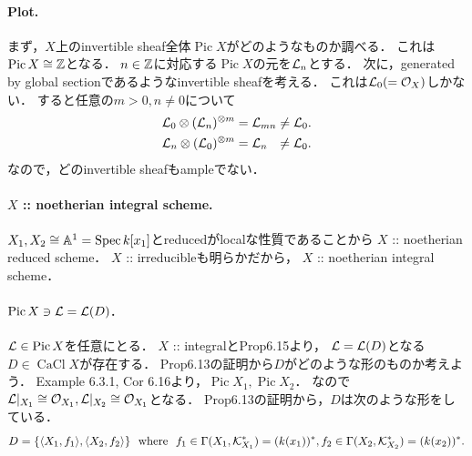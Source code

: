 \documentclass[a4paper]{jsarticle}
\newcommand{\CaCl}{\operatorname{CaCl}}
\newcommand{\Pic}{\operatorname{Pic}}
\begin{document}
    \paragraph{Plot.}
    まず，$X$上のinvertible sheaf全体$\Pic X$がどのようなものか調べる．
    これは$\Pic X \iso \Z$となる．
    $n \in \mathbb{Z}$に対応する$\Pic X$の元を$\mathcal{L}_n$とする．
    次に，generated by global sectionであるようなinvertible sheafを考える．
    これは$\mathcal{L}_0(=\mathcal{O}_X)$しかない．
    すると任意の$m>0, n \neq 0$について
    \begin{align*}
        \mathcal{L}_0 \otimes (\mathcal{L}_n)^{\otimes m} &= \mathcal{L}_{mn} \neq \mathcal{L}_0. \\
        \mathcal{L}_n \otimes (\mathcal{L}_0)^{\otimes m} &= \mathcal{L}_n \hspace{7pt}\neq \mathcal{L}_0.
    \end{align*}
    なので，どのinvertible sheafもampleでない．

    \paragraph{$X$ :: noetherian integral scheme.}
    $X_1, X_2 \cong \mathbb{A}^1=\operatorname{Spec} k[x_1]$とreducedがlocalな性質であることから
    $X$ :: noetherian reduced scheme．
    $X$ :: irreducibleも明らかだから，
    $X$ :: noetherian integral scheme．

    \paragraph{$\Pic X \ni \shL=\shL(D)$.}
    $\shL \in \Pic X$を任意にとる．
    $X$ :: integralとProp6.15より，
    $\mathcal{L}=\mathcal{L}(D)$となる$D \in \CaCl X$が存在する．
    Prop6.13の証明から$D$がどのような形のものか考えよう．
    Example 6.3.1, Cor 6.16より，$\Pic X_1, \Pic X_2$．
    なので$\mathcal{L}|_{X_1} \cong \mathcal{O}_{X_1}, \mathcal{L}|_{X_2} \cong \mathcal{O}_{X_1}$となる．
    Prop6.13の証明から，$D$は次のような形をしている．
    \[
        D=\{ \langle X_1,f_1 \rangle, \langle X_2,f_2 \rangle \}
        ~~\text{where}~~
        f_1 \in \Gamma(X_1, \mathcal{K}_{X_1}^*)=(k(x_1))^*,
        f_2 \in \Gamma(X_2, \mathcal{K}_{X_2}^*)=(k(x_2))^*.
    \]
\end{document}
